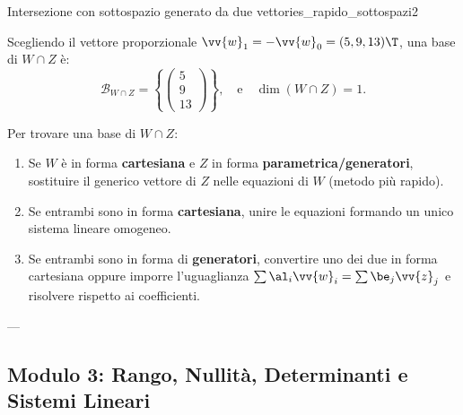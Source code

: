 \begin{esempio}{Intersezione con sottospazio generato da due vettori}{es_rapido_sottospazi2}
\begin{dimostrazione}[Risoluzione]
\begin{equation}
\end{equation}
Scegliendo il vettore proporzionale $\vv{w}_1 = -\vv{w}_0 = (5, 9, 13)\T$, una base di $W \cap Z$ è:
\begin{equation}
    \mathcal{B}_{W \cap Z} = \left\{ \begin{pmatrix} 5 \\ 9 \\ 13 \end{pmatrix} \right\}, \quad \text{e} \quad \dim(W \cap Z) = 1.
\end{equation}
\end{dimostrazione}
\end{esempio}

\begin{metodo}
Per trovare una base di $W \cap Z$:
\begin{enumerate}
    \item Se $W$ è in forma \textbf{cartesiana} e $Z$ in forma \textbf{parametrica/generatori}, sostituire il generico vettore di $Z$ nelle equazioni di $W$ (metodo più rapido).
    \item Se entrambi sono in forma \textbf{cartesiana}, unire le equazioni formando un unico sistema lineare omogeneo.
    \item Se entrambi sono in forma di \textbf{generatori}, convertire uno dei due in forma cartesiana oppure imporre l'uguaglianza $\sum \al_i \vv{w}_i = \sum \be_j \vv{z}_j$ e risolvere rispetto ai coefficienti.
\end{enumerate}
\end{metodo}

---

\subsection{Modulo 3: Rango, Nullità, Determinanti e Sistemi Lineari}

